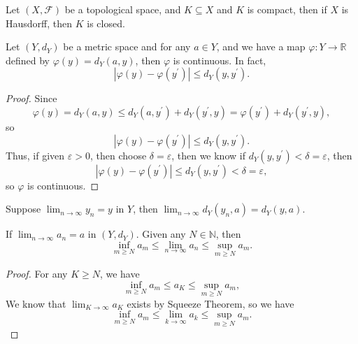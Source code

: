 \begin{lemma}[HW6 P4]
    Let \((X, \mathcal{F} )\) be a topological space, and \(K \subseteq X\) and \(K\) is compact, then if \(X\) is Hausdorff, then \(K\) is closed.     
\end{lemma}
\begin{lemma} \label{lm: d(a, y) for fix a is continuous}
    Let \((Y, d_Y)\) be a metric space and for any \(a \in Y\), and we have a map \(\varphi :Y \to \mathbb{R} \) defined by \(\varphi (y) = d_Y(a, y)\), then \(\varphi \) is continuous. In fact, 
    \[
        \left\vert \varphi (y) - \varphi \left( y^{\prime}  \right)  \right\vert \le d_Y \left( y, y^{\prime}  \right).  
    \]    
\end{lemma}
\begin{proof}
    Since 
    \[
        \varphi (y) = d_Y(a, y) \le d_Y \left( a, y^{\prime}  \right) + d_Y \left( y^{\prime} , y \right) = \varphi \left( y^{\prime}  \right) + d_Y \left( y^{\prime} , y \right),     
    \]
    so 
    \[
        \left\vert \varphi \left( y \right) - \varphi \left( y^{\prime}  \right)   \right\vert \le d_Y \left( y, y^{\prime}  \right).
    \]
    Thus, if given \(\varepsilon > 0\), then choose \(\delta = \varepsilon \), then we know if \(d_Y \left( y, y^{\prime}  \right) < \delta = \varepsilon \), then 
    \[
        \left\vert \varphi (y) - \varphi \left( y^{\prime}  \right)  \right\vert \le d_Y \left( y, y^{\prime}  \right) < \delta = \varepsilon, 
    \] so \(\varphi \) is continuous. 
\end{proof}

\begin{remark}
    Suppose \(\lim_{n \to \infty} y_n = y \) in \(Y\), then \(\lim_{n \to \infty} d_Y \left( y_n, a \right) = d_Y \left( y, a \right)   \).
\end{remark}

\begin{lemma} \label{lm: an converge to a then inf leq lim leq sup}
    If \(\lim_{n \to \infty} a_n = a \) in \((Y, d_Y)\). Given any \(N \in \mathbb{N} \), then 
    \[
        \inf _{m \ge N} a_m \le \lim_{n \to \infty} a_n \le \sup _{m \ge N} a_m. 
    \]  
\end{lemma}
\begin{proof}
    For any \(K \ge N\), we have 
    \[
        \inf _{m \ge N} a_m \le a_K \le \sup _{m \ge N} a_m,
    \] We know that \(\lim_{K \to \infty} a_K \) exists by Squeeze Theorem, so we have 
    \[
        \inf _{m \ge N} a_m  \le \lim_{k \to \infty} a_k \le \sup _{m \ge N} a_m.
    \] 
\end{proof}

